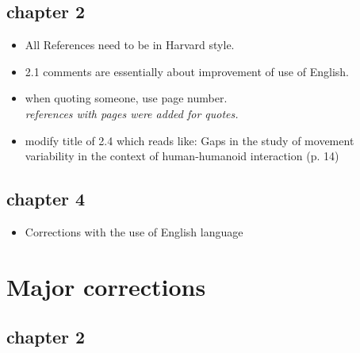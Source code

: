 \documentclass[10pt]{article}
\begin{document}
\subsection{chapter 2}

\begin{itemize}[noitemsep,topsep=0pt]
\item All References need to be in Harvard style. 
\item 2.1 comments are essentially about improvement of use of English.
\item when quoting someone, use page number.\\
\textit{references with pages were added for quotes.}

\item modify title of 2.4 which reads like:
	Gaps in the study of movement variability in the context of 
	human-humanoid interaction (p. 14)
\end{itemize}

\subsection{chapter 4}

\begin{itemize}[noitemsep,topsep=0pt]
\item Corrections with the use of English language
\end{itemize}



\section{Major corrections}

\subsection{chapter 2}
\end{document}
